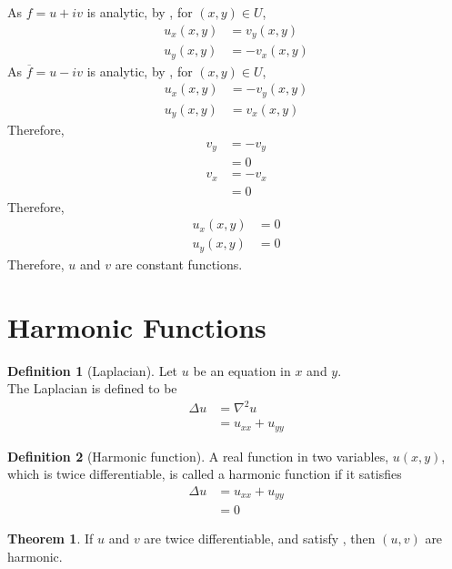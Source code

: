 \documentclass[titlepage, fleqn, a4paper, 12pt, twoside]{article}
\theoremstyle{definition}
\newtheorem{definition}{Definition}
\theoremstyle{theorem}
\newtheorem{theorem}{Theorem}
\begin{document}
\begin{solution}
	As $f = u + i v$ is analytic, by , for $(x,y) \in U$,
	\begin{align*}
		u_x(x,y) & = v_y(x,y) \\
		u_y(x,y) & = -v_x(x,y)
	\end{align*}
	As $\overline{f} = u - i v$ is analytic, by , for $(x,y) \in U$,
	\begin{align*}
		u_x(x,y) & = -v_y(x,y) \\
		u_y(x,y) & = v_x(x,y)
	\end{align*}
	Therefore,
	\begin{align*}
		v_y & = -v_y \\
                    & = 0    \\
		v_x & = -v_x \\
                    & = 0
	\end{align*}
	Therefore,
	\begin{align*}
		u_x(x,y) & = 0 \\
		u_y(x,y) & = 0
	\end{align*}
	Therefore, $u$ and $v$ are constant functions.
\end{solution}

\section{Harmonic Functions}

\begin{definition}[Laplacian]
	Let $u$ be an equation in $x$ and $y$.\\
	The Laplacian is defined to be
	\begin{align*}
		\Delta u & = \nabla^2 u \\
                         & = u_{x x} + u_{y y}
	\end{align*}
\end{definition}

\begin{definition}[Harmonic function]
	A real function in two variables, $u(x,y)$, which is twice differentiable, is called a harmonic function if it satisfies
	\begin{align*}
		\Delta u & = u_{x x} + u_{y y} \\
                         & = 0
	\end{align*}
\end{definition}

\begin{theorem}
	If $u$ and $v$ are twice differentiable, and satisfy , then $(u,v)$ are harmonic.
\end{theorem}
\end{document}

